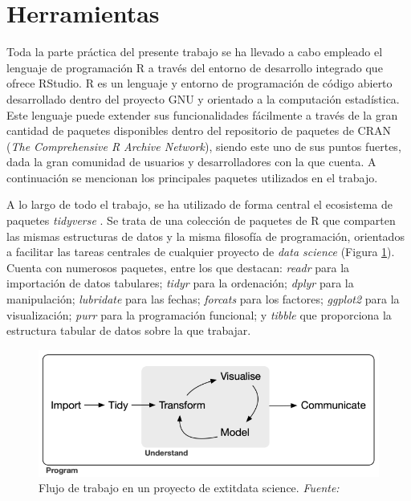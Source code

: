 \documentclass[12pt,a4paper,]{book}
\numberwithin{dummy}{section}
\theoremstyle{ocrenumbox}
\theoremstyle{blacknumex}
\theoremstyle{blacknumbox}
\theoremstyle{ocrenum}
\theoremstyle{ocrenum}
\begin{document}
\hypertarget{herramientas}{%
\section{Herramientas}\label{herramientas}}

Toda la parte práctica del presente trabajo se ha llevado a cabo
empleado el lenguaje de programación R \citep{Rproject} a través del
entorno de desarrollo integrado que ofrece RStudio. R es un lenguaje y
entorno de programación de código abierto desarrollado dentro del
proyecto GNU y orientado a la computación estadística. Este lenguaje
puede extender sus funcionalidades fácilmente a través de la gran
cantidad de paquetes disponibles dentro del repositorio de paquetes de
CRAN (\emph{The Comprehensive R Archive Network}), siendo este uno de
sus puntos fuertes, dada la gran comunidad de usuarios y desarrolladores
con la que cuenta. A continuación se mencionan los principales paquetes
utilizados en el trabajo.

A lo largo de todo el trabajo, se ha utilizado de forma central el
ecosistema de paquetes \emph{tidyverse} \citep{tidyversepackage}. Se
trata de una colección de paquetes de R que comparten las mismas
estructuras de datos y la misma filosofía de programación, orientados a
facilitar las tareas centrales de cualquier proyecto de \emph{data
science} (Figura \ref{fig:tidiverse_workflow}). Cuenta con numerosos
paquetes, entre los que destacan: \emph{readr} para la importación de
datos tabulares; \emph{tidyr} para la ordenación; \emph{dplyr} para la
manipulación; \emph{lubridate} para las fechas; \emph{forcats} para los
factores; \emph{ggplot2} para la visualización; \emph{purr} para la
programación funcional; y \emph{tibble} que proporciona la estructura
tabular de datos sobre la que trabajar.

\begin{figure}[H]

{\centering \includegraphics[width=0.95\linewidth]{graficos/tidyverse_workflow} 

}

\caption{Flujo de trabajo en un proyecto de     extit{data science}. \it Fuente: \citet{tidyversepackage}}\label{fig:tidiverse_workflow}
\end{figure}
\end{document}
